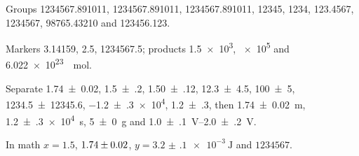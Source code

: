 \documentclass{article}
\begin{document}
Groups \num[group-digits=none]{1234567.891011}, \num[group-digits=integer]{1234567.891011},
\num[group-digits=decimal]{1234567.891011}, \num[group-digits]{12345}, \num[group-minimum-digits=4]{1234},
\num[group-minimum-digits=4]{123.4567}, \num[group-separator={,}]{1234567}, \num[group-separator=\;]{98765.43210}
and \num[group-separator = {,} , group-minimum-digits = 3]{123456.123}.

Markers \num[output-decimal-marker={,}]{3.14159}, \num[output-decimal-marker=\cdot]{2.5},
\num[output-decimal-marker={,}, group-separator={.}]{1234567.5}; products
\num[exponent-product=\cdot]{1.5e3}, \num[exponent-product = \cdot]{e5} and \SI[exponent-product=\cdot]{6.022e23}{\per\mole}.

Separate \num[uncertainty-mode=separate]{1.74 \pm 0.02}, \num[separate-uncertainty]{1.5(2)},
\num[separate-uncertainty=true]{1.50(12)}, \num[uncertainty-mode=separate]{12.3(45)},
\num[uncertainty-mode=separate]{100 \pm 5}, \num[uncertainty-mode=separate]{1234.5(123456)},
\num[uncertainty-mode=separate]{-1.2(3)e4}, \num[separate-uncertainty=false]{1.2(3)}, then
\SI[separate-uncertainty]{1.74 \pm 0.02}{\metre}, \qty[separate-uncertainty]{1.2(3)e4}{\second},
\qty[separate-uncertainty]{5 \pm 0}{\gram} and \qtyrange[separate-uncertainty]{1.0(1)}{2.0(2)}{\volt}.

In math $x = \num[output-decimal-marker={,}]{1.5}$, $\num[separate-uncertainty]{1.74 \pm 0.02}$,
$y=\qty[separate-uncertainty, exponent-product=\cdot]{3.2(1)e-3}{\joule}$ and
$\num[group-separator={,}]{1234567}$.
\end{document}
